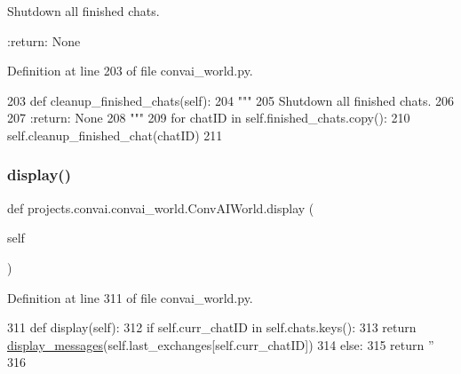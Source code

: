 \begin{DoxyVerb}Shutdown all finished chats.

:return: None
\end{DoxyVerb}
 

Definition at line 203 of file convai\+\_\+world.\+py.


\begin{DoxyCode}
203     \textcolor{keyword}{def }cleanup\_finished\_chats(self):
204         \textcolor{stringliteral}{"""}
205 \textcolor{stringliteral}{        Shutdown all finished chats.}
206 \textcolor{stringliteral}{}
207 \textcolor{stringliteral}{        :return: None}
208 \textcolor{stringliteral}{        """}
209         \textcolor{keywordflow}{for} chatID \textcolor{keywordflow}{in} self.finished\_chats.copy():
210             self.cleanup\_finished\_chat(chatID)
211 
\end{DoxyCode}
\mbox{\label{classprojects_1_1convai_1_1convai__world_1_1ConvAIWorld_a0fab2b57d8eb4f4e9329c43d9a223ff4}} 
\subsubsection{\texorpdfstring{display()}{display()}}
{\footnotesize\ttfamily def projects.\+convai.\+convai\+\_\+world.\+Conv\+A\+I\+World.\+display (\begin{DoxyParamCaption}\item[{}]{self }\end{DoxyParamCaption})}



Definition at line 311 of file convai\+\_\+world.\+py.


\begin{DoxyCode}
311     \textcolor{keyword}{def }display(self):
312         \textcolor{keywordflow}{if} self.curr\_chatID \textcolor{keywordflow}{in} self.chats.keys():
313             \textcolor{keywordflow}{return} \hyperlink{namespaceparlai_1_1utils_1_1misc_a7c86f996f4b55a960da46c1142a2c507}{display\_messages}(self.last\_exchanges[self.curr\_chatID])
314         \textcolor{keywordflow}{else}:
315             \textcolor{keywordflow}{return} \textcolor{stringliteral}{''}
316 
\end{DoxyCode}
\mbox{\label{classprojects_1_1convai_1_1convai__world_1_1ConvAIWorld_a1c2a2ebebc08b1283d51defc4e4406cf}} 
